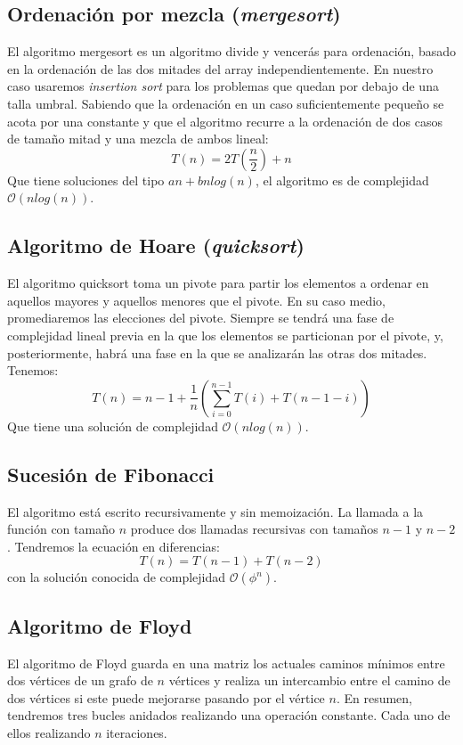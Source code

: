 \documentclass[a4paper, 11pt]{article} %
\begin{document}
\subsection{Ordenación por mezcla (\textit{mergesort})}
El algoritmo mergesort es un algoritmo divide y vencerás para ordenación, basado en la ordenación de las dos mitades del
array independientemente. En nuestro caso usaremos \textit{insertion sort} para los problemas que quedan por debajo de una talla umbral.
Sabiendo que la ordenación en un caso suficientemente pequeño se acota por una constante y que el algoritmo recurre a la ordenación
de dos casos de tamaño mitad y una mezcla de ambos lineal:
\begin{equation}
 T(n) = 2T\left(\frac{n}{2}\right) + n
\end{equation}
Que tiene soluciones del tipo $an + bnlog(n)$, el algoritmo es de complejidad $\mathcal{O}(nlog(n))$.


\subsection{Algoritmo de Hoare (\textit{quicksort})}
El algoritmo quicksort toma un pivote para partir los elementos a ordenar en aquellos mayores y aquellos menores que el pivote.
En su caso medio, promediaremos las elecciones del pivote. Siempre se tendrá una fase de complejidad lineal previa en la que los
elementos se particionan por el pivote, y, posteriormente, habrá una fase en la que se analizarán las otras dos mitades. Tenemos:
\begin{equation}
 T(n) = n - 1 + \frac{1}{n}\left(\sum_{i=0}^{n-1} T(i) + T(n-1-i) \right)
\end{equation}
Que tiene una solución de complejidad $\mathcal{O}(nlog(n))$.


\subsection {Sucesión de Fibonacci}
El algoritmo está escrito recursivamente y sin memoización. La llamada a la función con tamaño $n$ produce 
dos llamadas recursivas con tamaños $n-1$ y $n-2$. Tendremos la ecuación en diferencias:
\begin{equation}
 T(n) = T(n-1) + T(n-2)
\end{equation}
con la solución conocida de complejidad $\mathcal{O}(\phi^n)$.

\subsection{Algoritmo de Floyd}
El algoritmo de Floyd guarda en una matriz los actuales caminos mínimos entre dos vértices de un grafo de $n$ vértices
y realiza un intercambio entre el camino de dos vértices si este puede mejorarse pasando por el vértice $n$. En resumen,
tendremos tres bucles anidados realizando una operación constante. Cada uno de ellos realizando $n$ iteraciones.
\end{document}
